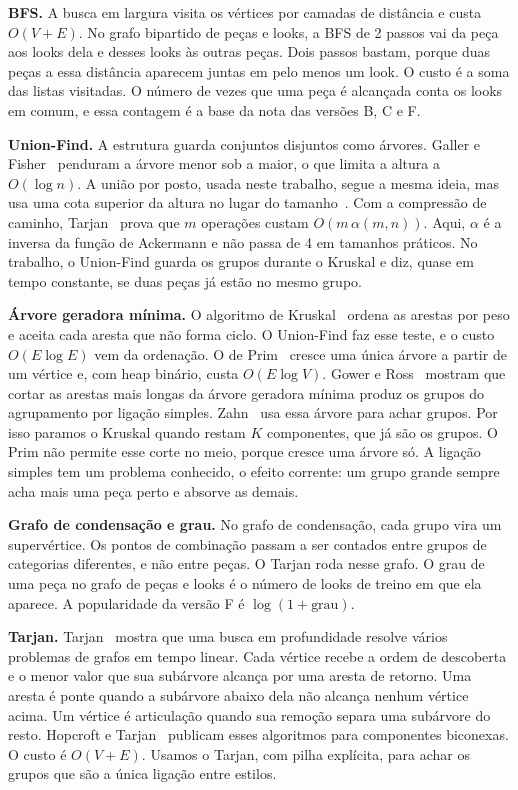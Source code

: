 \textbf{BFS.} A busca em largura visita os vértices por camadas de distância e custa $O(V + E)$. No grafo bipartido de peças e looks, a BFS de 2 passos vai da peça aos looks dela e desses looks às outras peças. Dois passos bastam, porque duas peças a essa distância aparecem juntas em pelo menos um look. O custo é a soma das listas visitadas. O número de vezes que uma peça é alcançada conta os looks em comum, e essa contagem é a base da nota das versões B, C e F.

\textbf{Union-Find.} A estrutura guarda conjuntos disjuntos como árvores. Galler e Fisher~\cite{galler1964} penduram a árvore menor sob a maior, o que limita a altura a $O(\log n)$. A união por posto, usada neste trabalho, segue a mesma ideia, mas usa uma cota superior da altura no lugar do tamanho~\cite{tarjan1975}. Com a compressão de caminho, Tarjan~\cite{tarjan1975} prova que $m$ operações custam $O(m\,\alpha(m, n))$. Aqui, $\alpha$ é a inversa da função de Ackermann e não passa de 4 em tamanhos práticos. No trabalho, o Union-Find guarda os grupos durante o Kruskal e diz, quase em tempo constante, se duas peças já estão no mesmo grupo.

\textbf{Árvore geradora mínima.} O algoritmo de Kruskal~\cite{kruskal1956} ordena as arestas por peso e aceita cada aresta que não forma ciclo. O Union-Find faz esse teste, e o custo $O(E \log E)$ vem da ordenação. O de Prim~\cite{prim1957} cresce uma única árvore a partir de um vértice e, com heap binário, custa $O(E \log V)$. Gower e Ross~\cite{gower1969} mostram que cortar as arestas mais longas da árvore geradora mínima produz os grupos do agrupamento por ligação simples. Zahn~\cite{zahn1971} usa essa árvore para achar grupos. Por isso paramos o Kruskal quando restam $K$ componentes, que já são os grupos. O Prim não permite esse corte no meio, porque cresce uma árvore só. A ligação simples tem um problema conhecido, o efeito corrente: um grupo grande sempre acha mais uma peça perto e absorve as demais.

\textbf{Grafo de condensação e grau.} No grafo de condensação, cada grupo vira um supervértice. Os pontos de combinação passam a ser contados entre grupos de categorias diferentes, e não entre peças. O Tarjan roda nesse grafo. O grau de uma peça no grafo de peças e looks é o número de looks de treino em que ela aparece. A popularidade da versão F é $\log(1 + \text{grau})$.

\textbf{Tarjan.} Tarjan~\cite{tarjan1972} mostra que uma busca em profundidade resolve vários problemas de grafos em tempo linear. Cada vértice recebe a ordem de descoberta e o menor valor que sua subárvore alcança por uma aresta de retorno. Uma aresta é ponte quando a subárvore abaixo dela não alcança nenhum vértice acima. Um vértice é articulação quando sua remoção separa uma subárvore do resto. Hopcroft e Tarjan~\cite{hopcroft1973} publicam esses algoritmos para componentes biconexas. O custo é $O(V + E)$. Usamos o Tarjan, com pilha explícita, para achar os grupos que são a única ligação entre estilos.

